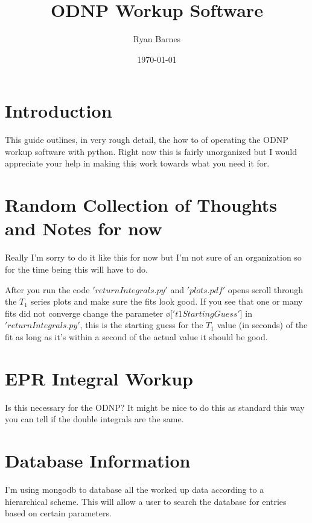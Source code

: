 \documentclass[10pt]{book}
\author{Ryan Barnes}
\title{ODNP Workup Software}
\date{\today}
\begin{document}
\maketitle
\section{Introduction}
This guide outlines, in very rough detail, the how to of operating the ODNP workup software with python. Right now this is fairly unorganized but I would appreciate your help in making this work towards what you need it for. 

\section{Random Collection of Thoughts and Notes for now}
Really I'm sorry to do it like this for now but I'm not sure of an organization so for the time being this will have to do.

After you run the code $'returnIntegrals.py'$ and $'plots.pdf'$ opens scroll through the $T_1$ series plots and make sure the fits look good. If you see that one or many fits did not converge change the parameter \o[$'t1StartingGuess'$]{} in $'returnIntegrals.py'$, this is the starting guess for the $T_1$ value (in seconds) of the fit as long as it's within a second of the actual value it should be good.

\section{EPR Integral Workup}
Is this necessary for the ODNP? It might be nice to do this as standard this way you can tell if the double integrals are the same.

\section{Database Information}
I'm using mongodb to database all the worked up data according to a hierarchical scheme. This will allow a user to search the database for entries based on certain parameters. 
\end{document}

